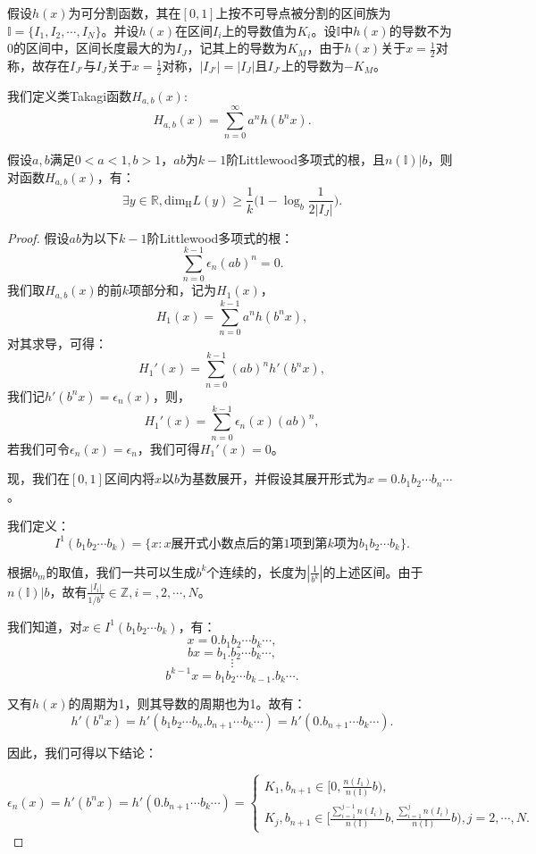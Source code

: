 假设$h(x)$为可分割函数，其在$[0,1]$上按不可导点被分割的区间族为$\mathbb{I}=\{I_1,I_2,\cdots,I_N\}$。并设$h(x)$在区间$I_i$上的导数值为$K_i$。设$\mathbb{I}$中$h(x)$的导数不为$0$的区间中，区间长度最大的为$I_J$，记其上的导数为$K_M$，由于$h(x)$关于$x=\frac{1}{2}$对称，故存在$I_{J'}$与$I_J$关于$x=\frac{1}{2}$对称，$|I_{J'}|=|I_J|$且$I_{J'} $上的导数为$-K_M$。

我们定义类Takagi函数$H_{a,b}(x)$:
$$
      H_{a,b}(x)=\sum_{n=0}^\infty a^nh(b^nx).
$$

假设$a,b$满足$0<a<1,b>1$，$ab$为$k-1$阶Littlewood多项式的根，且$n(\mathbb{I})|b$，则对函数$H_{a,b}(x)$，有：
$$
      \exists y\in\mathbb{R},\mathrm{dim_H}L(y)\ge\frac{1}{k}\Big(1-\log_b\frac{1}{2|I_J|}\Big).
$$

\begin{proof}
假设$ab$为以下$k-1$阶Littlewood多项式的根：
$$
      \sum_{n=0}^{k-1}\epsilon_n(ab)^n=0.
$$
我们取$H_{a,b}(x)$的前$k$项部分和，记为$H_1(x)$，
$$
      H_1(x)=\sum_{n=0}^{k-1}a^nh(b^nx),
$$
对其求导，可得：
$$
      H_1'(x)=\sum_{n=0}^{k-1}(ab)^nh'(b^nx),
$$
我们记$h'(b^nx)=\epsilon_n(x)$，则，
$$
      H_1'(x)=\sum_{n=0}^{k-1}\epsilon_n(x)(ab)^n,
$$
若我们可令$\epsilon_n(x)=\epsilon_n$，我们可得$H_1'(x)=0$。

现，我们在$[0,1]$区间内将$x$以$b$为基数展开，并假设其展开形式为$x=0.b_1b_2\cdots b_n\cdots$。

我们定义：
$$
      I^1(b_1b_2\cdots b_k)=\{x:x\mbox{展开式小数点后的第}1\mbox{项到第}k\mbox{项为}b_1b_2\cdots b_k\}.
$$

根据$b_m$的取值，我们一共可以生成$b^k$个连续的，长度为$|\frac{1}{b^k}|$的上述区间。由于$n(\mathbb{I})|b$，故有$\frac{|I_i|}{1/b^k}\in\mathbb{Z},i=,2,\cdots,N$。

我们知道，对$x\in I^1(b_1b_2\cdots b_k)$，有：
$$
      x=0.b_1b_2\cdots b_k\cdots,
$$
$$
bx=b_1.b_2\cdots b_k\cdots,
$$
$$
      \vdots
$$
$$
b^{k-1}x=b_1b_2\cdots b_{k-1}.b_k\cdots.
$$

又有$h(x)$的周期为1，则其导数的周期也为1。故有：
$$
      h'(b^nx)=h'(b_1b_2\cdots b_n.b_{n+1}\cdots b_k\cdots)=h'(0.b_{n+1}\cdots b_k\cdots).
$$

因此，我们可得以下结论：

$$
      \epsilon_n(x)=h'(b^nx)=h'(0.b_{n+1}\cdots b_k\cdots)=
      \begin{cases}
            K_1,b_{n+1}\in{[}0,\frac{n(I_1)}{n(\mathbb{I})}b{)},\\
            K_j,b_{n+1}\in{[}\frac{\sum_{i=1}^{j-1}n(I_i)}{n(\mathbb{I})}b,\frac{\sum_{i=1}^{j}n(I_i)}{n(\mathbb{I})}b{)},j=2,\cdots,N.
      \end{cases}
$$


\end{proof}
